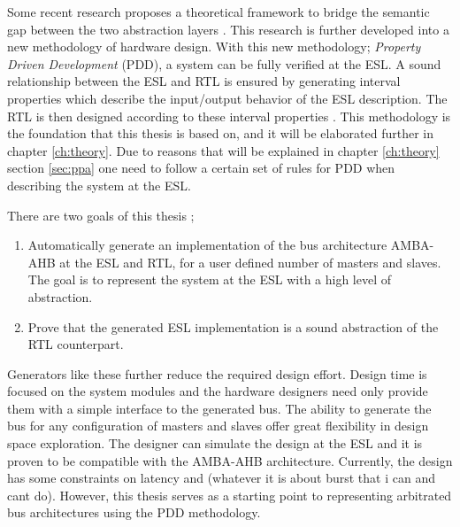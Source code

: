 Some recent research proposes a theoretical framework to bridge the semantic gap between the two abstraction layers \cite{2014-UrdahlStoffel.etal}. This research is further developed into a new methodology of hardware design. With this new methodology; \textit{Property Driven Development} (PDD), a system can be fully verified at the ESL. A sound relationship between the ESL and RTL is ensured by generating interval properties which describe the input/output behavior of the ESL description. The RTL is then designed according to these interval properties \cite{pddref}. This methodology is the foundation that this thesis is based on, and it will be elaborated further in chapter \ref{ch:theory}. Due to reasons that will be explained in chapter \ref{ch:theory} section \ref{sec:ppa} one need to follow a certain set of rules for PDD when describing the system at the ESL. \par 
There are two goals of this thesis ; \\
\begin{enumerate}
 \item Automatically generate an implementation of the bus architecture AMBA-AHB at the ESL and RTL, for a user defined number of masters and slaves. The goal
is to represent the system at the ESL with a high level of abstraction.
 \item Prove that the generated ESL implementation is a sound abstraction of the RTL counterpart.
\end{enumerate}

Generators like these further reduce the required design effort. Design time is focused on the system modules and the hardware designers need only provide them with a simple interface to the generated bus. The ability to generate the bus for any configuration of masters and slaves offer great flexibility in design space exploration. The designer can simulate the design at the ESL and it is proven to be compatible with the AMBA-AHB architecture. Currently, the design has some constraints on latency and (whatever it is about burst that i can and cant do). However, this thesis serves as a starting point to representing arbitrated bus architectures using the PDD methodology.   


 


